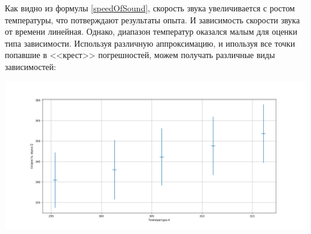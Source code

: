 \documentclass{article}
\begin{document}
Как видно из формулы \eqref{speedOfSound}, скорость звука увеличивается с ростом температуры, что потверждают результаты опыта. И зависимость скорости звука от времени линейная. Однако, диапазон температур оказался малым для оценки типа зависимости. Используя различную аппроксимацию, и ипользуя все точки попавшие в <<крест>> погрешностей, можем получать различные виды зависимостей:
\begin{center}
    \includegraphics[scale = 0.2]{sppedByT.png}
\end{center}

    
\end{document}
